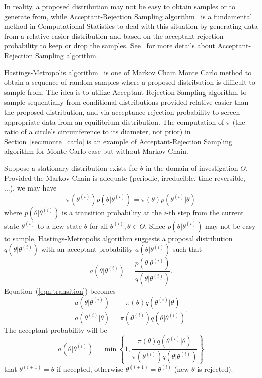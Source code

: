In reality, a proposed distribution may not be easy to obtain samples or
to generate from, while Acceptant-Rejection Sampling
algorithm~ is a fundamental
method in Computational Statistics to deal with this situation by generating
data from a relative easier distribution and based on the acceptant-rejection
probability to keep or drop the samples. See~\citet{Ross1996} for more details
about Acceptant-Rejection Sampling algorithm.

Hastings-Metropolis algorithm~\citep{Hastings1970,Metropolis1953}
is one of Markov Chain Monte Carlo method to obtain
a sequence of random samples where a proposed distribution is difficult to
sample from. The idea is to utilize Acceptant-Rejection Sampling algorithm
to sample sequentially from conditional distributions provided relative
easier than the proposed distribution, and via acceptance rejection
probability to screen appropriate data from an equilibrium distribution.
The computation of $\pi$
(the ratio of a circle's circumference to its diameter, not prior)
in Section~\ref{sec:monte_carlo} is an example of Acceptant-Rejection Sampling
algorithm for Monte Carlo case but without Markov Chain.

Suppose a stationary distribution exists for $\theta$ in the domain of
investigation $\Theta$. Provided the Markov Chain is adequate
(periodic, irreducible, time reversible, ...), we may have
\begin{equation}
\pi(\theta^{(i)}) p(\theta | \theta^{(i)}) =
\pi(\theta) p(\theta^{(i)} | \theta)
\label{eqn:transition}
\end{equation}
where $p(\theta | \theta^{(i)})$ is a transition probability at the $i$-th step
from the current state $\theta^{(i)}$ to a new state $\theta$ for all
$\theta^{(i)}, \theta \in \Theta$.
Since $p(\theta | \theta^{(i)})$ may not be easy to sample, Hastings-Metropolis
algorithm suggests a proposal distribution $q(\theta | \theta^{(i)})$ with an
acceptant probability $a(\theta | \theta^{(i)})$ such that
\begin{equation}
a(\theta | \theta^{(i)}) =
\frac{p(\theta | \theta^{(i)})}{q(\theta | \theta^{(i)})}.
\label{eqn:accpetance}
\end{equation}
Equation~(\ref{eqn:transition}) becomes
\begin{equation}
\frac{a(\theta | \theta^{(i)})}{a(\theta^{(i)} | \theta)}
=
\frac{\pi(\theta) q(\theta^{(i)} | \theta)}{
      \pi(\theta^{(i)}) q(\theta | \theta^{(i)})}.
\label{eqn:acceptant_rejection}
\end{equation}
The acceptant probability will be
\begin{equation}
a(\theta | \theta^{(i)}) = \min \left\{
1,
\frac{\pi(\theta) q(\theta^{(i)} | \theta)}{
      \pi(\theta^{(i)}) q(\theta | \theta^{(i)})}
\right\}
\label{eqn:acceptant_probability}
\end{equation}
that
$\theta^{(i+1)} = \theta$ if accepted, otherwise
$\theta^{(i+1)} = \theta^{(i)}$ (new $\theta$ is rejected).

